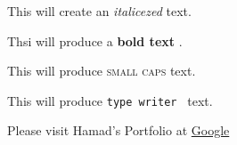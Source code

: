 \documentclass[11pt]{article}
\begin{document}
This will create an \textit{italicezed} text.

Thsi will produce a \textbf{bold text} .

This will produce \textsc{small caps } text.

This will produce \texttt{type writer } text.

Please visit Hamad's Portfolio at \href{https://www.google.com}{Google}
\end{document}
